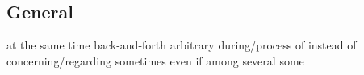 \subsection*{General}
   {at the same time}
   {back-and-forth}
   {arbitrary}
   {during/process of}
   {instead of}
   {concerning/regarding}
   {sometimes}
   {even if}
   {among}
   {several}
   {some}
